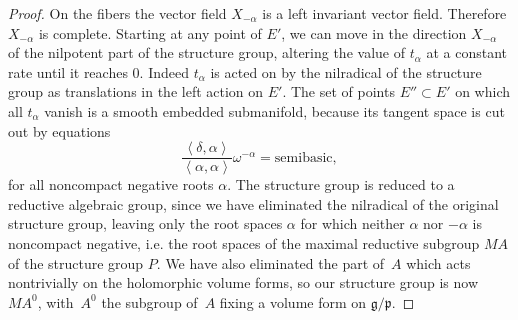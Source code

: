\begin{proof}
On the f\/ibers the vector f\/ield $X_{-\alpha}$ is a left invariant vector f\/ield.
Therefore $X_{-\alpha}$ is complete. Starting at any point of $E'$,
we can move in the direction $X_{-\alpha}$ of the nilpotent part
of the structure group, altering the value of $t_{\alpha}$ at a constant rate
until it reaches $0$. Indeed $t_{\alpha}$ is acted on by the nilradical
of the structure group as translations in the left action on $E'$. The set of points
$E'' \subset E'$ on which all $t_{\alpha}$ vanish is a smooth embedded
submanifold, because its tangent space is cut out by equations
\[
\frac{\left<\delta,\alpha\right>}{\left<\alpha,\alpha\right>} \omega^{-\alpha} = \text{semibasic},
\]
for all noncompact negative roots $\alpha.$ The structure group is
reduced to
a reductive algebraic group, since we have eliminated the nilradical
of the original structure group, leaving only the root spaces
$\alpha$ for which neither $\alpha$ nor $-\alpha$ is
noncompact negative, i.e.
the root spaces of the maximal reductive subgroup $MA$
of the structure group $P$. We have also eliminated the
part of~$A$ which acts nontrivially on the holomorphic
volume forms, so our structure group is now~$MA^0$,
with~$A^0$ the subgroup of~$A$ f\/ixing a volume form on
$\mathfrak{g}/\mathfrak{p}$.
\end{proof}
